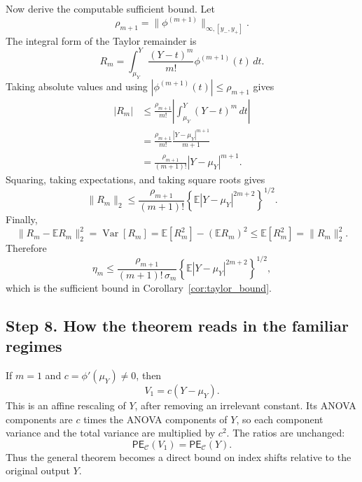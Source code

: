 \documentclass[11pt,letterpaper]{article}
\DeclareMathOperator{\Var}{Var}
\newcommand{\E}{\mathbb{E}}
\theoremstyle{remark}
\begin{document}
Now derive the computable sufficient bound. Let
\begin{equation}
  \rho_{m+1}=\|\phi^{(m+1)}\|_{\infty,[y_-,y_+]}.
\end{equation}
The integral form of the Taylor remainder is
\begin{equation}
  R_m
  =\int_{\mu_Y}^{Y}
    \frac{(Y-t)^m}{m!}\phi^{(m+1)}(t)\,dt.
\end{equation}
Taking absolute values and using
$|\phi^{(m+1)}(t)|\leq\rho_{m+1}$ gives
\begin{align}
  |R_m|
  &\leq
  \frac{\rho_{m+1}}{m!}
  \left|\int_{\mu_Y}^{Y}(Y-t)^m\,dt\right| \\
  &=
  \frac{\rho_{m+1}}{m!}
  \frac{|Y-\mu_Y|^{m+1}}{m+1} \\
  &=
  \frac{\rho_{m+1}}{(m+1)!}|Y-\mu_Y|^{m+1}.
\end{align}
Squaring, taking expectations, and taking square roots gives
\begin{equation}
  \|R_m\|_2
  \leq
  \frac{\rho_{m+1}}{(m+1)!}
  \left\{\E|Y-\mu_Y|^{2m+2}\right\}^{1/2}.
\end{equation}
Finally,
\begin{equation}
  \|R_m-\E R_m\|_2^2
  =\Var[R_m]
  =\E[R_m^2]-(\E R_m)^2
  \leq \E[R_m^2]
  =\|R_m\|_2^2.
\end{equation}
Therefore
\begin{equation}
  \eta_m
  \leq
  \frac{\rho_{m+1}}{(m+1)!\,\sigma_m}
  \left\{\E|Y-\mu_Y|^{2m+2}\right\}^{1/2},
\end{equation}
which is the sufficient bound in Corollary~\ref{cor:taylor_bound}.

\subsection*{Step 8. How the theorem reads in the familiar regimes}

If $m=1$ and $c=\phi'(\mu_Y)\neq0$, then
\begin{equation}
  V_1=c(Y-\mu_Y).
\end{equation}
This is an affine rescaling of $Y$, after removing an irrelevant constant. Its
ANOVA components are $c$ times the ANOVA components of $Y$, so each component
variance and the total variance are multiplied by $c^2$. The ratios are
unchanged:
\begin{equation}
  \mathsf{PE}_{\mathscr C}(V_1)=\mathsf{PE}_{\mathscr C}(Y).
\end{equation}
Thus the general theorem becomes a direct bound on index shifts relative to the
original output $Y$.
\end{document}

